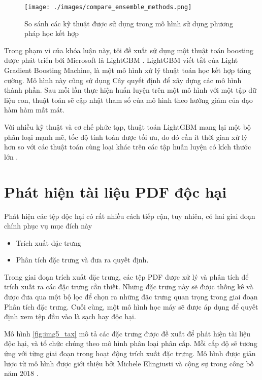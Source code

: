 \documentclass[./../main.tex]{subfiles}
\begin{document}
\begin{figure}[ht!]
	\centering
	\texttt{[image: ./images/compare\_ensemble\_methods.png]}
	\caption{So sánh các kỹ thuật được sử dụng trong mô hình sử dụng phương pháp học kết hợp}
	\label{fig:compare_ensemble_methods}
\end{figure}

Trong phạm vi của khóa luận này, tôi đề xuất sử dụng một thuật toán boosting được phát triển bởi Microsoft là LightGBM \cite{lightgbm}. LightGBM viết tắt của Light Gradient Boosting Machine, là một mô hình xử lý thuật toán học kết hợp tăng cường. Mô hình này cũng sử dụng Cây quyết định để xây dựng các mô hình thành phần. Sau mỗi lần thực hiện huấn luyện trên một mô hình với một tập dữ liệu con, thuật toán sẽ cập nhật tham số của mô hình theo hướng giảm của đạo hàm hàm mất mát.

Với nhiều kỹ thuật và cơ chế phức tạp, thuật toán LightGBM mang lại một bộ phân loại mạnh mẽ, tốc độ tính toán được tối ưu, do đó cần ít thời gian xử lý hơn so với các thuật toán cùng loại khác trên các tập huấn luyện có kích thước lớn \cite{lightgbm}.

\section{Phát hiện tài liệu PDF độc hại}

Phát hiện các tệp độc hại có rất nhiều cách tiếp cận, tuy nhiên, có hai giai đoạn chính phục vụ mục đích này

\begin{itemize}
	\item Trích xuất đặc trưng
	\item Phân tích đặc trưng và đưa ra quyết định.
\end{itemize}


Trong giai đoạn trích xuất đặc trưng, các tệp PDF được xử lý và phân tích để trích xuất ra các đặc trưng cần thiết. Những đặc trưng này sẽ được thống kê và được đưa qua một bộ lọc để chọn ra những đặc trưng quan trọng trong giai đoạn Phân tích đặc trưng. Cuối cùng, một mô hình học máy sẽ được áp dụng để quyết định xem tệp đầu vào là sạch hay độc hại.

Mô hình \ref{fig:img5_tax} mô tả các đặc trưng được đề xuất để phát hiện tài liệu độc hại, và tổ chức chúng theo mô hình phân loại phân cấp. Mỗi cấp độ sẽ tương ứng với từng giai đoạn trong hoạt động trích xuất đặc trưng. Mô hình được giản lược từ mô hình được giới thiệu bởi Michele Elingiusti và cộng sự trong công bố năm 2018 \cite{tax}.
\end{document}
